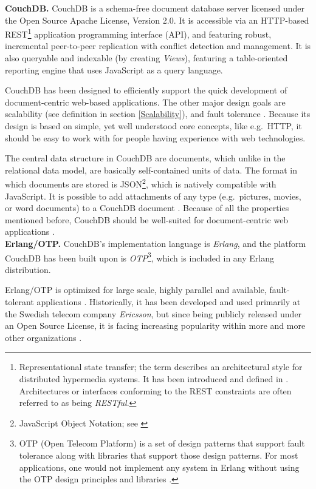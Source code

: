 \noindent
{\bf CouchDB.}
CouchDB is a schema-free document database server licensed under the Open Source Apache License, Version 2.0. It is accessible via an HTTP-based REST\footnote{Representational state transfer; the term describes an architectural style for distributed hypermedia systems. It has been introduced and defined in \cite[p.~76ff]{Fie00}. Architectures or interfaces conforming to the REST constraints are often referred to as being \emph{RESTful}.} application programming interface (API), and featuring robust, incremental peer-to-peer replication with conflict detection and management. It is also queryable and indexable (by creating \emph{Views}), featuring a table-oriented reporting engine that uses JavaScript as a query language.

CouchDB has been designed to efficiently support the quick development of document-centric web-based applications. The other major design goals are scalability (see definition in section \ref{Scalability}), and fault tolerance \cite[p.~4]{ASL10}. Because its design is based on simple, yet well understood core concepts, like e.g.\ HTTP, it should be easy to work with for people having experience with web technologies.

The central data structure in CouchDB are documents, which unlike in the relational data model, are basically self-contained units of data. The format in which documents are stored is JSON\footnote{JavaScript Object Notation; see \cite{rfc4627}}, which is natively compatible with JavaScript. It is possible to add attachments of any type (e.g.\ pictures, movies, or word documents) to a CouchDB document \cite[p.~41]{ASL10}. Because of all the properties mentioned before, CouchDB should be well-suited for document-centric web applications \cite[p.~4]{ASL10}.\\

\noindent
{\bf Erlang/OTP.}
CouchDB's implementation language is \emph{Erlang}, and the platform CouchDB has been built upon is \emph{OTP}\footnote{OTP (Open Telecom Platform) is a set of design patterns that support fault tolerance along with libraries that support those design patterns. For most applications, one would not implement any system in Erlang without using the OTP design principles and libraries \cite[p.~16]{LMC10}.}, which is included in any Erlang distribution.

Erlang/OTP is optimized for large scale, highly parallel and available, fault-tolerant applications \cite[p.~12]{Arm07} \cite{Eri09b}. Historically, it has been developed and used primarily at the Swedish telecom company \emph{Ericsson}, but since being publicly released under an Open Source License, it is facing increasing popularity within more and more other organizations \cite[p.~6f]{Arm03} \cite{Eri09a}.


